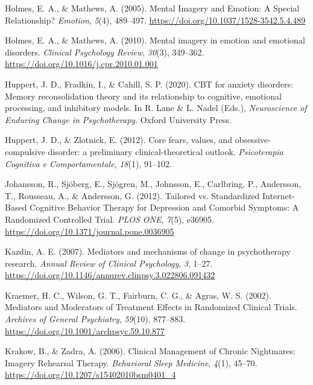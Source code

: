 \documentclass[
  man,floatsintext]{apa7}
\newlength{\cslhangindent}
\newlength{\cslentryspacingunit} %
\newenvironment{CSLReferences}[2] %
 {%
  \setlength{\parindent}{0pt}
  \ifodd #1
  \let\oldpar\par
  \def\par{\hangindent=\cslhangindent\oldpar}
  \fi
  \setlength{\parskip}{#2\cslentryspacingunit}
 }%
 {}
\begin{document}
\begin{CSLReferences}{1}{0}
\leavevmode{}%
Holmes, E. A., \& Mathews, A. (2005). Mental Imagery and Emotion: A Special Relationship? \emph{Emotion}, \emph{5}(4), 489--497. \url{https://doi.org/10.1037/1528-3542.5.4.489}

\leavevmode{}%
Holmes, E. A., \& Mathews, A. (2010). Mental imagery in emotion and emotional disorders. \emph{Clinical Psychology Review}, \emph{30}(3), 349--362. \url{https://doi.org/10.1016/j.cpr.2010.01.001}

\leavevmode{}%
Huppert, J. D., Fradkin, I., \& Cahill, S. P. (2020). CBT for anxiety disorders: Memory reconsolidation theory and its relationship to cognitive, emotional processing, and inhibitory models. In R. Lane \& L. Nadel (Eds.), \emph{Neuroscience of Enduring Change in Psychotherapy}. Oxford University Press.

\leavevmode{}%
Huppert, J. D., \& Zlotnick, E. (2012). Core fears, values, and obsessive-compulsive disorder: a preliminary clinical-theoretical outlook. \emph{Psicoterapia Cognitiva e Comportamentale}, \emph{18}(1), 91--102.

\leavevmode{}%
Johansson, R., Sjöberg, E., Sjögren, M., Johnsson, E., Carlbring, P., Andersson, T., Rousseau, A., \& Andersson, G. (2012). Tailored vs. Standardized Internet-Based Cognitive Behavior Therapy for Depression and Comorbid Symptoms: A Randomized Controlled Trial. \emph{PLOS ONE}, \emph{7}(5), e36905. \url{https://doi.org/10.1371/journal.pone.0036905}

\leavevmode{}%
Kazdin, A. E. (2007). Mediators and mechanisms of change in psychotherapy research. \emph{Annual Review of Clinical Psychology}, \emph{3}, 1--27. \url{https://doi.org/10.1146/annurev.clinpsy.3.022806.091432}

\leavevmode{}%
Kraemer, H. C., Wilson, G. T., Fairburn, C. G., \& Agras, W. S. (2002). Mediators and Moderators of Treatment Effects in Randomized Clinical Trials. \emph{Archives of General Psychiatry}, \emph{59}(10), 877--883. \url{https://doi.org/10.1001/archpsyc.59.10.877}

\leavevmode{}%
Krakow, B., \& Zadra, A. (2006). Clinical Management of Chronic Nightmares: Imagery Rehearsal Therapy. \emph{Behavioral Sleep Medicine}, \emph{4}(1), 45--70. \url{https://doi.org/10.1207/s15402010bsm0401_4}


\end{CSLReferences}
\end{document}
